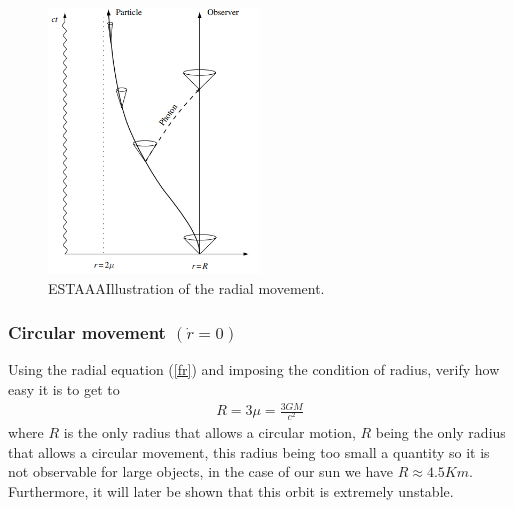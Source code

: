 \documentclass[letterpaper,11pt,onecolumn]{article}
\begin{document}
 \begin{figure}[h!]
    \centering
    \includegraphics[width=0.5\textwidth]{Report/Images/3_foton_radia.png}
    \caption{{\color{red} ESTAAA}Illustration of the radial movement.}
\label{radm}
\end{figure}

\subsubsection{Circular movement $(\dot{r}=0)$}
Using the radial equation (\ref{fr}) and imposing the condition of radius, verify how easy it is to get to
\begin{eqnarray*}
          R=3\mu=\frac{3GM}{c^{2}}
\end{eqnarray*}
where $R$ is the only radius that allows a circular motion, $R$ being the only radius that allows a circular movement, this radius being too small a quantity so it is not observable for large objects, in the case of our sun we have $R \approx 4.5 Km$. Furthermore, it will later be shown that this orbit is extremely unstable.
\end{document}
